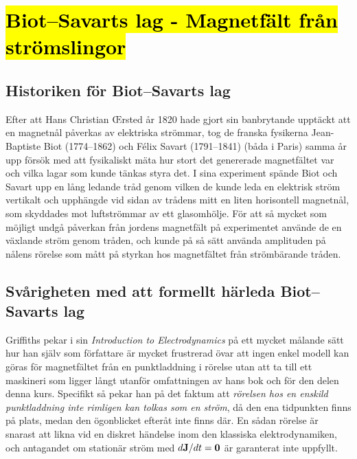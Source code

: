 {{{\section{{\hl{Biot--Savarts lag - Magnetf{\"a}lt fr{\aa}n str{\"o}mslingor}}}
\subsection{Historiken f{\"o}r Biot--Savarts lag}
Efter att Hans Christian {\OE}rsted {\aa}r 1820 hade gjort sin banbrytande
uppt{\"a}ckt att en magnetn{\aa}l p{\aa}verkas av elektriska str{\"o}mmar, tog
de franska fysikerna Jean-Baptiste Biot (1774--1862)  och F\'elix Savart (1791--1841)  (b{\aa}da i Paris) samma {\aa}r upp f{\"o}rs{\"o}k med att
fysikaliskt m{\"a}ta hur stort det genererade magnetf{\"a}ltet var och vilka
lagar som kunde t{\"a}nkas styra det.
I sina experiment sp{\"a}nde Biot och Savart upp en l{\aa}ng ledande tr{\aa}d
genom vilken de kunde leda en elektrisk str{\"o}m vertikalt och upph{\"a}ngde
vid sidan av tr{\aa}dens mitt en liten horisontell magnetn{\aa}l, som skyddades
mot luftstr{\"o}mmar av ett glasomh{\"o}lje.
F{\"o}r att s{\aa} mycket som m{\"o}jligt undg{\aa} p{\aa}verkan fr{\aa}n
jordens magnetf{\"a}lt p{\aa} experimentet anv{\"a}nde de en v{\"a}xlande
str{\"o}m genom tr{\aa}den, och kunde p{\aa} s{\aa} s{\"a}tt anv{\"a}nda
amplituden p{\aa} n{\aa}lens r{\"o}relse som m{\aa}tt p{\aa} styrkan hos
magnetf{\"a}ltet fr{\aa}n str{\"o}mb{\"a}rande tr{\aa}den.

\subsection{Sv{\aa}righeten med att formellt h{\"a}rleda Biot--Savarts lag}
Griffiths pekar i sin {\it Introduction to Electrodynamics} p{\aa} ett mycket
m{\aa}lande s{\"a}tt hur han sj{\"a}lv som f{\"o}rfattare {\"a}r mycket
frustrerad {\"o}var att ingen enkel modell kan g{\"o}ras f{\"o}r
magnetf{\"a}ltet fr{\aa}n en punktladdning i r{\"o}relse utan att ta till ett
maskineri som ligger l{\aa}ngt utanf{\"o}r omfattningen av hans bok och f{\"o}r
den delen denna kurs.
Specifikt s{\aa} pekar han p{\aa} det faktum att {\it r{\"o}relsen hos en
enskild punktladdning inte rimligen kan tolkas som en str{\"o}m}, d{\aa} den
ena tidpunkten finns p{\aa} plats, medan den {\"o}gonblicket efter{\aa}t inte
finns d{\"a}r.
En s{\aa}dan r{\"o}relse {\"a}r snarast att likna vid en diskret h{\"a}ndelse
inom den klassiska elektrodynamiken, och antagandet om station{\"a}r str{\"o}m
med $d{\bf J}/dt={\bf 0}$ {\"a}r garanterat inte uppfyllt.

}}}
